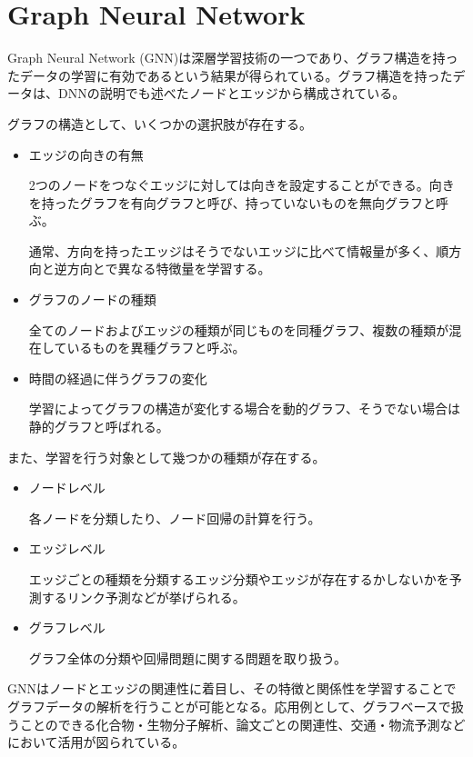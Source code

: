 \section{Graph Neural Network}
Graph Neural Network (GNN)は深層学習技術の一つであり、グラフ構造を持ったデータの学習に有効であるという結果が得られている。グラフ構造を持ったデータは、DNNの説明でも述べたノードとエッジから構成されている。

グラフの構造として、いくつかの選択肢が存在する。
\begin{itemize}
\item エッジの向きの有無

2つのノードをつなぐエッジに対しては向きを設定することができる。向きを持ったグラフを有向グラフと呼び、持っていないものを無向グラフと呼ぶ。

通常、方向を持ったエッジはそうでないエッジに比べて情報量が多く、順方向と逆方向とで異なる特徴量を学習する。

\item グラフのノードの種類

全てのノードおよびエッジの種類が同じものを同種グラフ、複数の種類が混在しているものを異種グラフと呼ぶ。

\item 時間の経過に伴うグラフの変化

学習によってグラフの構造が変化する場合を動的グラフ、そうでない場合は静的グラフと呼ばれる。

\end{itemize}

また、学習を行う対象として幾つかの種類が存在する。
\begin{itemize}
\item ノードレベル　

各ノードを分類したり、ノード回帰の計算を行う。

\item エッジレベル

エッジごとの種類を分類するエッジ分類やエッジが存在するかしないかを予測するリンク予測などが挙げられる。

\item グラフレベル

グラフ全体の分類や回帰問題に関する問題を取り扱う。
\end{itemize}


GNNはノードとエッジの関連性に着目し、その特徴と関係性を学習することでグラフデータの解析を行うことが可能となる。応用例として、グラフベースで扱うことのできる化合物・生物分子解析、論文ごとの関連性、交通・物流予測などにおいて活用が図られている。

